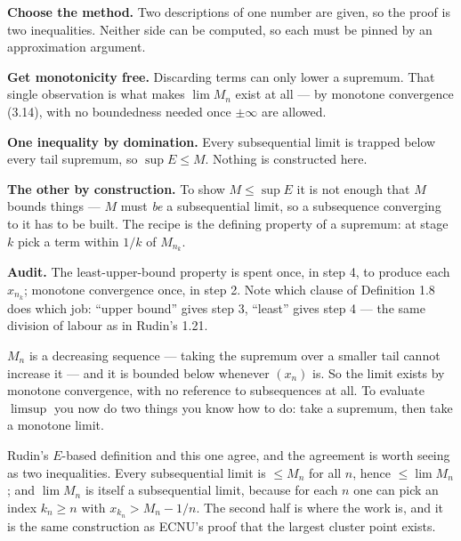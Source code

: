 \begin{proofwalk}
  \item \textbf{Choose the method.} Two descriptions of one number are
        given, so the proof is two inequalities. Neither side can be
        computed, so each must be pinned by an approximation argument.
  \item \textbf{Get monotonicity free.} Discarding terms can only lower a
        supremum. That single observation is what makes $\lim M_n$ exist at
        all --- by monotone convergence (3.14), with no boundedness needed
        once $\pm\infty$ are allowed.
  \item \textbf{One inequality by domination.} Every subsequential limit is
        trapped below every tail supremum, so $\sup E \le M$. Nothing is
        constructed here.
  \item \textbf{The other by construction.} To show $M \le \sup E$ it is not
        enough that $M$ bounds things --- $M$ must \emph{be} a subsequential
        limit, so a subsequence converging to it has to be built. The
        recipe is the defining property of a supremum: at stage $k$ pick a
        term within $1/k$ of $M_{n_k}$.
  \item \textbf{Audit.} The least-upper-bound property is spent once, in
        step 4, to produce each $x_{n_k}$; monotone convergence once, in
        step 2. Note which clause of Definition 1.8 does which job: ``upper
        bound'' gives step 3, ``least'' gives step 4 --- the same division of
        labour as in Rudin's 1.21.
\end{proofwalk}

\begin{unpack}
$M_n$ is a decreasing sequence --- taking the supremum over a smaller tail
cannot increase it --- and it is bounded below whenever $(x_n)$ is. So the
limit exists by monotone convergence, with no reference to subsequences at
all. To evaluate $\limsup$ you now do two things you know how to do: take a
supremum, then take a monotone limit.

Rudin's $E$-based definition and this one agree, and the agreement is worth
seeing as two inequalities. Every subsequential limit is $\le M_n$ for all
$n$, hence $\le \lim M_n$; and $\lim M_n$ is itself a subsequential limit,
because for each $n$ one can pick an index $k_n \ge n$ with
$x_{k_n} > M_n - 1/n$. The second half is where the work is, and it is the
same construction as ECNU's proof that the largest cluster point exists.
\end{unpack}

